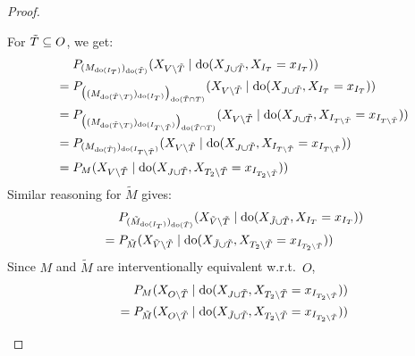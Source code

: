 \begin{proof}
\begin{enumerate}[resume*]
  For $\tilde{T} \subseteq O$, we get:
  \begin{align*}
    & P_{(M_{\operatorname{do}(I_T)})_{\operatorname{do}(\tilde{T})}}(X_{V\setminus\tilde{T}} \mid \operatorname{do}(X_{J\cup\tilde{T}},X_{I_T}=x_{I_T})) \\
    {} = {} & P_{\big((M_{\operatorname{do}(\tilde{T}\setminus T)})_{\operatorname{do}(I_T)}\big)_{\operatorname{do}(\tilde{T} \cap T)}}(X_{V\setminus\tilde{T}} \mid \operatorname{do}(X_{J\cup\tilde{T}},X_{I_T}=x_{I_T})) \\
    {} = {} & P_{\big((M_{\operatorname{do}(\tilde{T}\setminus T)})_{\operatorname{do}(I_{T\setminus\tilde{T}})}\big)_{\operatorname{do}(\tilde{T} \cap T)}}(X_{V\setminus\tilde{T}} \mid \operatorname{do}(X_{J\cup\tilde{T}},X_{I_{T\setminus\tilde{T}}}=x_{I_{T\setminus\tilde{T}}})) \\
    {} = {} & P_{(M_{\operatorname{do}(\tilde{T})})_{\operatorname{do}(I_{T\setminus\tilde{T}})}}(X_{V\setminus\tilde{T}} \mid \operatorname{do}(X_{J\cup\tilde{T}},X_{I_{T\setminus\tilde{T}}}=x_{I_{T\setminus\tilde{T}}})) \\
    {} = {} & P_M(X_{V\setminus\tilde{T}} \mid \operatorname{do}(X_{J\cup\tilde{T}},X_{T_2\setminus\tilde{T}}=x_{I_{T_2\setminus\tilde{T}}})) 
  \end{align*}
  Similar reasoning for $\tilde{M}$ gives:
  \begin{align*}
    & P_{(\tilde{M}_{\operatorname{do}(I_T)})_{\operatorname{do}(\tilde{T})}}(X_{\tilde{V}\setminus\tilde{T}} \mid \operatorname{do}(X_{\tilde{J}\cup\tilde{T}},X_{I_T}=x_{I_T})) \\
    {} = {} & P_{\tilde{M}}(X_{\tilde{V}\setminus\tilde{T}} \mid \operatorname{do}(X_{\tilde{J}\cup\tilde{T}},X_{T_2\setminus\tilde{T}}=x_{I_{T_2\setminus\tilde{T}}}))
  \end{align*}
  Since $M$ and $\tilde{M}$ are interventionally equivalent w.r.t.\ $O$, 
  \begin{align*}
    {}   {} & P_M(X_{O\sm\tilde{T}} \mid \doit(X_{J\cup\tilde{T}},X_{T_2\sm\tilde{T}}=x_{I_{T_2\sm\tilde{T}}})) \\
    {} = {} & P_{\tilde{M}}(X_{O\sm\tilde{T}} \mid \doit(X_{\tilde{J}\cup\tilde{T}},X_{T_2\sm\tilde{T}}=x_{I_{T_2\sm\tilde{T}}}))

\end{align*}
\end{enumerate}
\end{proof}
